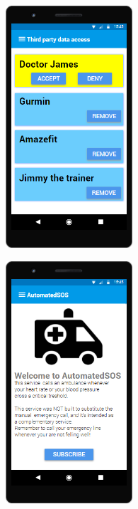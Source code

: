 \begin{figure}[H]
\centering
\begin{minipage}{.5\textwidth}
  \centering
  \includegraphics[width=5cm,height=9cm]{resources/Screen/ThirdPartyManagementIndividual.png}
  \label{fig:App ThirdParty Management}
\end{minipage}%
\begin{minipage}{.5\textwidth}
  \centering
  \includegraphics[width=5cm,height=9cm]{resources/Screen/AutomatedSOSIndividual.png}
  \label{fig:App AutomatedSOS}
\end{minipage}
\end{figure}

